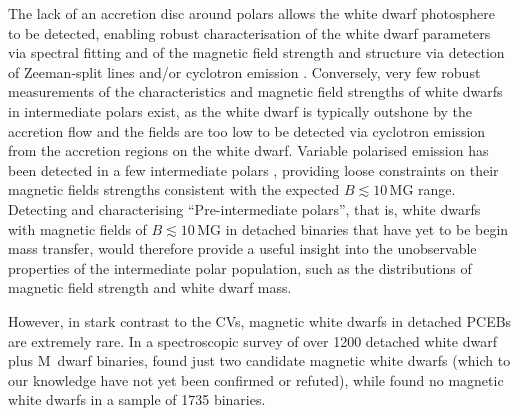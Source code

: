 \documentclass[fleqn,usenatbib]{mnras}
\begin{document}
The lack of an accretion disc around polars allows the white dwarf photosphere to be detected, enabling robust characterisation of the white dwarf parameters via spectral fitting and of the magnetic field strength and structure via detection of Zeeman-split lines and/or cyclotron emission \citep[e.g.][]{schwope90-1, gaensickeetal04-1, ferrarioetal95-1}. Conversely, very few robust measurements of the characteristics and magnetic field strengths of white dwarfs in intermediate polars exist, as the white dwarf is typically outshone by the accretion flow and the fields are too low to be detected via cyclotron emission from the accretion regions on the white dwarf. Variable polarised emission has been detected in a few intermediate polars \citep[e.g. ][]{potter+buckley18-1}, providing loose constraints on their magnetic fields strengths consistent with the expected $B \lesssim 10$\,MG range. Detecting and characterising ``Pre-intermediate polars'', that is, white dwarfs with magnetic fields of  $B \lesssim 10$\,MG in detached binaries that have yet to be begin mass transfer, would therefore provide a useful insight into the unobservable properties of the intermediate polar population, such as the distributions of magnetic field strength and white dwarf mass. 

However, in stark contrast to the CVs, magnetic white dwarfs in detached PCEBs are extremely rare. In a spectroscopic survey of over 1200 detached white dwarf plus M~dwarf binaries, \citet{silvestrietal07-1} found just two candidate magnetic white dwarfs (which to our knowledge have not yet been confirmed or refuted), while \citet{liebertetal15-1} found no magnetic white dwarfs in a sample of 1735 binaries. 
\end{document}
